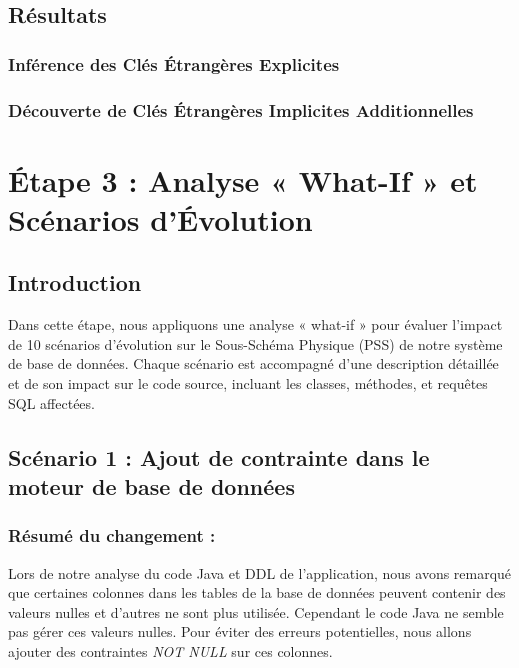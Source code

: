\documentclass[a4paper,11pt]{article}
\begin{document}
\subsection{Résultats}
\subsubsection{Inférence des Clés Étrangères Explicites}


\subsubsection{Découverte de Clés Étrangères Implicites Additionnelles}

\section{Étape 3 : Analyse « What-If » et Scénarios d'Évolution}

\subsection*{Introduction}
Dans cette étape, nous appliquons une analyse « what-if » pour évaluer l'impact de 10 scénarios d'évolution sur le Sous-Schéma Physique (PSS) de notre système de base de données. Chaque scénario est accompagné d'une description détaillée et de son impact sur le code source, incluant les classes, méthodes, et requêtes SQL affectées.


\subsection*{Scénario 1 : Ajout de contrainte dans le moteur de base de données}

\subsubsection*{Résumé du changement :}

Lors de notre analyse du code Java et DDL de l'application, nous avons remarqué que certaines colonnes dans les tables de la base de données peuvent contenir des valeurs nulles et d'autres ne sont plus utilisée. Cependant le code Java ne semble pas gérer ces valeurs nulles. Pour éviter des erreurs potentielles, nous allons ajouter des contraintes \textit{NOT NULL} sur ces colonnes.
\end{document}
